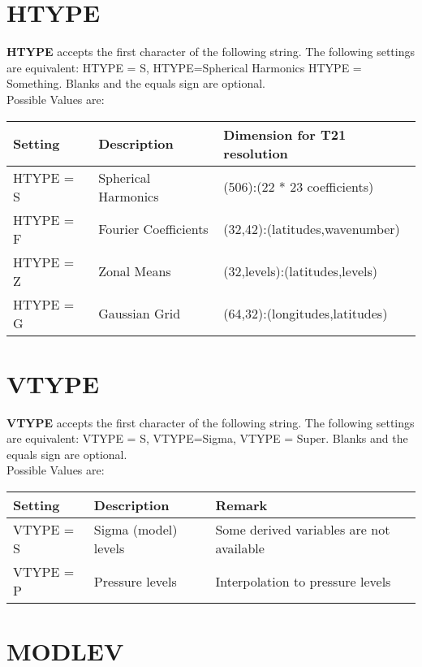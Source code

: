 \section{HTYPE}

{\bf HTYPE} accepts the first character of the following string.
The following settings are equivalent: HTYPE = S, HTYPE=Spherical Harmonics
HTYPE = Something. Blanks and the equals sign are optional. \\
Possible Values are: \vspace{0.4cm}

\begin{tabular}{|l|l|l|}
\hline
   Setting   & Description          & Dimension for T21 resolution   \\
\hline
   HTYPE = S & Spherical Harmonics  & (506):(22 * 23 coefficients)   \\
   HTYPE = F & Fourier Coefficients & (32,42):(latitudes,wavenumber) \\
   HTYPE = Z & Zonal Means          & (32,levels):(latitudes,levels) \\
   HTYPE = G & Gaussian Grid        & (64,32):(longitudes,latitudes) \\
\hline
\end{tabular}

\section{VTYPE}

{\bf VTYPE} accepts the first character of the following string.
The following settings are equivalent: VTYPE = S, VTYPE=Sigma,
VTYPE = Super. Blanks and the equals sign are optional. \\
Possible Values are: \vspace{0.4cm}

\begin{tabular}{|l|l|l|}
\hline
   Setting   & Description          & Remark \\
\hline
   VTYPE = S & Sigma (model) levels & Some derived variables are not available \\
   VTYPE = P & Pressure levels      & Interpolation to pressure levels \\
\hline
\end{tabular}

\section{MODLEV}

